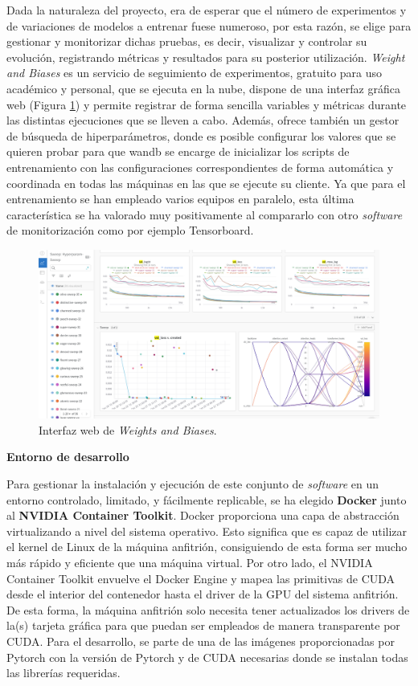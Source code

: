 Dada la naturaleza del proyecto, era de esperar que el número de experimentos y de variaciones de modelos a entrenar fuese numeroso, por esta razón, se elige  \cite{wandb} para gestionar y monitorizar dichas pruebas, es decir, visualizar y controlar su evolución, registrando métricas y resultados para su posterior utilización. \textit{Weight and Biases} es un servicio de seguimiento de experimentos, gratuito para uso académico y personal, que se ejecuta en la nube, dispone de una interfaz gráfica web (Figura \ref{fig:wandb-ui}) y permite registrar de forma sencilla variables y métricas durante las distintas ejecuciones que se lleven a cabo. Además, ofrece también un gestor de búsqueda de hiperparámetros, donde es posible configurar los valores que se quieren probar para que wandb se encarge de inicializar los scripts de entrenamiento con las configuraciones correspondientes de forma automática y coordinada en todas las máquinas en las que se ejecute su cliente. Ya que para el entrenamiento se han empleado varios equipos en paralelo, esta última característica se ha valorado muy positivamente al compararlo con otro \textit{software} de monitorización como por ejemplo Tensorboard.

\begin{figure}[H]
\centering
\includegraphics[width=\textwidth]{imagenes/wandb-ui.png}
\caption{Interfaz web de \textit{Weights and Biases}.}
\label{fig:wandb-ui}
\end{figure}

\textbf{Entorno de desarrollo}

Para gestionar la instalación y ejecución de este conjunto de \textit{software} en un entorno controlado, limitado, y fácilmente replicable, se ha elegido \textbf{Docker} junto al \textbf{NVIDIA Container Toolkit}. Docker proporciona una capa de abstracción virtualizando a nivel del sistema operativo. Esto significa que es capaz de utilizar el kernel de Linux de la máquina anfitrión, consiguiendo de esta forma ser mucho más rápido y eficiente que una máquina virtual. Por otro lado, el NVIDIA Container Toolkit envuelve el Docker Engine y mapea las primitivas de CUDA desde el interior del contenedor hasta el driver de la GPU del sistema anfitrión. De esta forma, la máquina anfitrión solo necesita tener actualizados los drivers de la(s) tarjeta gráfica para que puedan ser empleados de manera transparente por CUDA. Para el desarrollo, se parte de una de las imágenes proporcionadas por Pytorch con la versión de Pytorch y de CUDA necesarias donde se instalan todas las librerías requeridas. 

